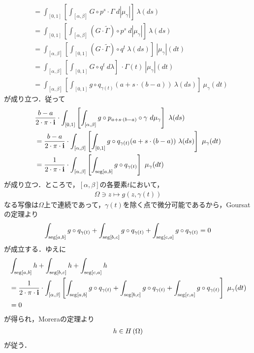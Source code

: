 \begin{sketch}[大雑把]
\begin{description}
\begin{align}
					&= \int_{[0,1]}
					\left[\int_{[\alpha,\beta]} G \circ p^{s} \cdot \Gamma\ d|\mu_{\gamma}|\right]\ \lambda(ds) \\
					&= \int_{[0,1]}
					\left[\int_{[\alpha,\beta]} (G \cdot \tilde{\Gamma}) \circ p^{s}\ d|\mu_{\gamma}|\right]\ \lambda(ds) \\
					&= \int_{[\alpha,\beta]}
					\left[\int_{[0,1]} (G \cdot \tilde{\Gamma}) \circ q^{t}\ \lambda(ds)\right]\ |\mu_{\gamma}|(dt) \\
					&= \int_{[\alpha,\beta]}
					\left[\int_{[0,1]} G \circ q^{t}\ d\lambda\right]\ \cdot \Gamma(t)\ |\mu_{\gamma}|(dt) \\
					&= \int_{[\alpha,\beta]}
					\left[\int_{[0,1]} g \circ q_{\gamma(t)}(a+s \cdot (b-a))\ \lambda(ds)\right]\ \mu_{\gamma}(dt)
				\end{align}
				が成り立つ．従って
				\begin{align}
					&\frac{b-a}{2\cdot\pi\cdot\mathbf{i}} \cdot \int_{[0,1]}
					\left[\int_{[\alpha,\beta]} g \circ p_{a+s \cdot (b-a)} \circ \gamma\ d\mu_{\gamma}\right]\ \lambda(ds) \\
					&= \frac{b-a}{2\cdot\pi\cdot\mathbf{i}} \cdot \int_{[\alpha,\beta]}
					\left[\int_{[0,1]} g \circ q_{\gamma(t)}(a+s \cdot (b-a))\ \lambda(ds)\right]\ \mu_{\gamma}(dt) \\
					&= \frac{1}{2\cdot\pi\cdot\mathbf{i}} \cdot \int_{[\alpha,\beta]}
					\left[\int_{\operatorname{seg}[a,b]} g \circ q_{\gamma(t)}\right]\ \mu_{\gamma}(dt)
				\end{align}
				が成り立つ．ところで，$[\alpha,\beta]$の各要素$t$において，
				\begin{align}
					\Omega \ni z \longmapsto g(z,\gamma(t))
				\end{align}
				なる写像は$\Omega$上で連続であって，$\gamma(t)$を除く点で微分可能であるから，Goursatの定理より
				\begin{align}
					\int_{\operatorname{seg}[a,b]} g \circ q_{\gamma(t)}
					+ \int_{\operatorname{seg}[b,c]} g \circ q_{\gamma(t)}
					+ \int_{\operatorname{seg}[c,a]} g \circ q_{\gamma(t)} 
					= 0
				\end{align}
				が成立する．ゆえに
				\begin{align}
					&\int_{\seg{a}{b}} h + \int_{\seg{b}{c}} h + \int_{\seg{c}{a}} h \\
					&= \frac{1}{2\cdot\pi\cdot\isym} \cdot \int_{[\alpha,\beta]}
					\left[\int_{\seg{a}{b}} g \circ q_{\gamma(t)}
					+ \int_{\seg{b}{c}} g \circ q_{\gamma(t)}
					+ \int_{\seg{c}{a}} g \circ q_{\gamma(t)} \right]\ \mu_{\gamma}(dt) \\
					&= 0
				\end{align}
				が得られ，Moreraの定理より
				\begin{align}
					h \in H\left(\Omega\right)
				\end{align}
				が従う．
			

\end{description}
\end{sketch}
